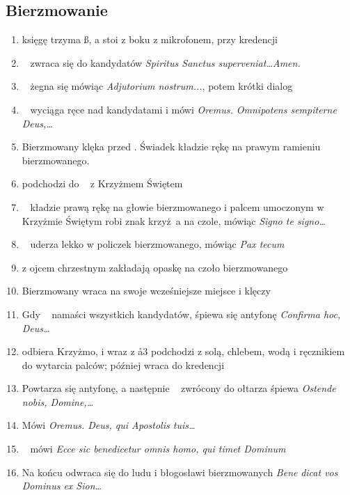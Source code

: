 \subsection{Bierzmowanie}
\label{sec:bierz}
\begin{enumerate}
      \item księgę trzyma \ss, a  stoi z boku z mikrofonem,  przy
            kredencji
      \item \ii~ zwraca się do kandydatów \textit{Spiritus
                  Sanctus superveniat\dots Amen.}
      \item \ii~ żegna się mówiąc \textit{Adjutorium nostrum...}, potem krótki
            dialog
      \item \ii~ wyciąga ręce nad kandydatami i mówi
            \textit{Oremus. Omnipotens sempiterne Deus,\dots}
      \item Bierzmowany klęka przed \ii. Świadek kładzie rękę na
            prawym ramieniu bierzmowanego.
      \item {} podchodzi do \dd~ z Krzyżmem Świętem
      \item \ii~ kładzie prawą rękę na głowie bierzmowanego i palcem umoczonym w
            Krzyżmie Świętym robi znak krzyż a na czole, mówiąc \textit{Signo te
                  signo\dots}
      \item \ii~ uderza lekko w policzek bierzmowanego, mówiąc \textit{Pax tecum}
      \item {} z ojcem chrzestnym zakładają opaskę na czoło bierzmowanego
      \item Bierzmowany wraca na swoje wcześniejsze miejsce i klęczy
      \item Gdy \ii~ namaści wszystkich kandydatów, śpiewa się antyfonę
            \textit{Confirma hoc, Deus\dots}
      \item {} odbiera Krzyżmo, i wraz z \aa3 podchodzi z solą, chlebem, wodą
            i ręcznikiem do wytarcia palców; później wraca do kredencji
      \item Powtarza się antyfonę, a następnie \ii~ zwrócony do ołtarza śpiewa
            \textit{Ostende nobis, Domine,\dots}
      \item Mówi \textit{Oremus. Deus, qui
                  Apostolis tuis\dots}
      \item \ii~ mówi \textit{Ecce sic benedicetur omnis homo, qui timet Dominum}
      \item Na końcu odwraca się do ludu i błogosławi bierzmowanych
            \textit{Bene} \textcolor{red}{}
            \textit{dicat vos Dominus ex Sion\dots}
\end{enumerate}

